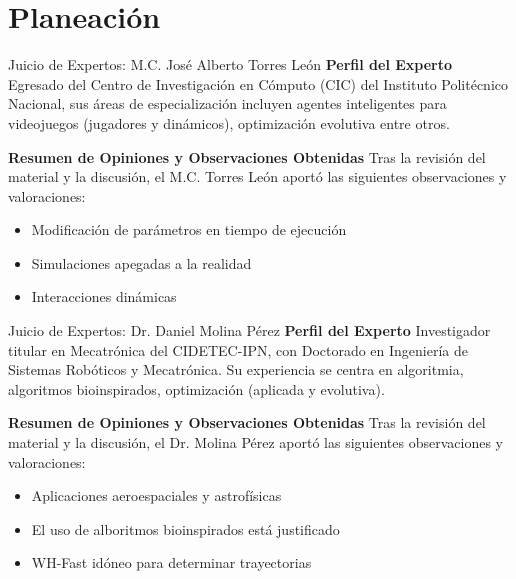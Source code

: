 \section{Planeación}

\begin{frame}{Juicio de Expertos: M.C. José Alberto Torres León}
  \textbf{Perfil del Experto}
  \RaggedRight
  \scriptsize
  Egresado del Centro de Investigación en Cómputo (CIC) del Instituto Politécnico Nacional, sus áreas de especialización
  incluyen agentes inteligentes para videojuegos (jugadores y dinámicos), optimización evolutiva entre otros.

  \bigskip

  \textbf{Resumen de Opiniones y Observaciones Obtenidas}
  \RaggedRight
  \scriptsize
  Tras la revisión del material y la discusión, el M.C. Torres León aportó las siguientes observaciones y valoraciones:
  \begin{itemize}
    \item Modificación de parámetros en tiempo de ejecución
    \item Simulaciones apegadas a la realidad
    \item Interacciones dinámicas
  \end{itemize}
\end{frame}

\begin{frame}{Juicio de Expertos: Dr. Daniel Molina Pérez}
  \textbf{Perfil del Experto}
  \RaggedRight
  \scriptsize
  Investigador titular en Mecatrónica del CIDETEC-IPN, con Doctorado en Ingeniería de Sistemas Robóticos y Mecatrónica.
  Su experiencia se centra en algoritmia, algoritmos bioinspirados, optimización (aplicada y evolutiva).

  \bigskip

  \textbf{Resumen de Opiniones y Observaciones Obtenidas}
  \RaggedRight
  \scriptsize
  Tras la revisión del material y la discusión, el Dr. Molina Pérez aportó las siguientes observaciones y valoraciones:
  \begin{itemize}
    \item Aplicaciones aeroespaciales y astrofísicas
    \item El uso de alboritmos bioinspirados está justificado
    \item WH-Fast idóneo para determinar trayectorias
  \end{itemize}
\end{frame}

